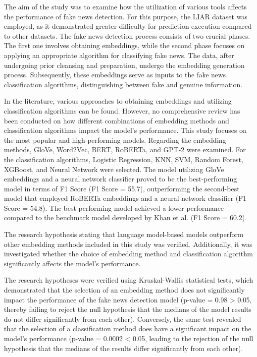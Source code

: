 The aim of the study was to examine how the utilization of various tools affects the performance of fake news detection. For this purpose, the LIAR dataset was employed, as it demonstrated greater difficulty for prediction execution compared to other datasets. The fake news detection process consists of two crucial phases. The first one involves obtaining embeddings, while the second phase focuses on applying an appropriate algorithm for classifying fake news. The data, after undergoing prior cleansing and preparation, undergo the embedding generation process. Subsequently, these embeddings serve as inputs to the fake news classification algorithms, distinguishing between fake and genuine information.

In the literature, various approaches to obtaining embeddings and utilizing classification algorithms can be found. However, no comprehensive review has been conducted on how different combinations of embedding methods and classification algorithms impact the model's performance. This study focuses on the most popular and high-performing models. Regarding the embedding methods, GloVe, Word2Vec, BERT, RoBERTa, and GPT-2 were examined. For the classification algorithms, Logistic Regression, KNN, SVM, Random Forest, XGBoost, and Neural Network were selected. The model utilizing GloVe embeddings and a neural network classifier proved to be the best-performing model in terms of F1 Score (F1 Score = 55.7), outperforming the second-best model that employed RoBERTa embeddings and a neural network classifier (F1 Score = 54.8). The best-performing model achieved a lower performance compared to the benchmark model developed by Khan et al. (F1 Score = 60.2).

The research hypothesis stating that language model-based models outperform other embedding methods included in this study was verified. Additionally, it was investigated whether the choice of embedding method and classification algorithm significantly affects the model's performance.


The research hypotheses were verified using Kruskal-Wallis statistical tests, which demonstrated that the selection of an embedding method does not significantly impact the performance of the fake news detection model (p-value = 0.98 > 0.05, thereby failing to reject the null hypothesis that the medians of the model results do not differ significantly from each other). Conversely, the same test revealed that the selection of a classification method does have a significant impact on the model's performance (p-value = 0.0002 < 0.05, leading to the rejection of the null hypothesis that the medians of the results differ significantly from each other).

